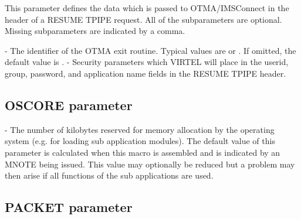 \documentclass[letterpaper,10pt,english]{sphinxmanual}
\begin{document}
This parameter defines the data which is passed to OTMA/IMSConnect in the header of a RESUME TPIPE request. All of the subparameters are optional. Missing subparameters are indicated by a comma.

 - The identifier of the OTMA exit routine. Typical values are  or . If omitted, the default value is .
 - Security parameters which VIRTEL will place in the userid, group, password, and application name fields in the RESUME TPIPE header.

\ignorespaces 

\subsection{OSCORE parameter}
\label{\detokenize{Installation_Guide:oscore-parameter}}\label{\detokenize{Installation_Guide:index-98}}
\begin{sphinxVerbatim}[commandchars=\\\{\}]
 
\end{sphinxVerbatim}

 - The number of kilobytes reserved for memory allocation by the operating system (e.g. for loading sub application modules). The default value of this parameter is calculated when this macro is assembled and is indicated by an MNOTE being issued. This value may optionally be reduced but a problem may then arise if all functions of the sub applications are used.

\ignorespaces 

\subsection{PACKET parameter}
\label{\detokenize{Installation_Guide:packet-parameter}}\label{\detokenize{Installation_Guide:index-99}}
\begin{sphinxVerbatim}[commandchars=\\\{\}]
 
\end{sphinxVerbatim}
\end{document}
